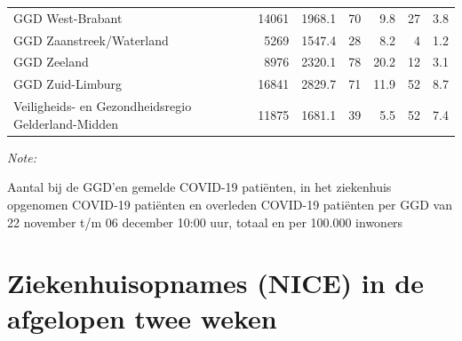 \documentclass[
  english,
  man,floatsintext]{apa6}
\begin{document}
\begin{table}
\begin{threeparttable}
\begin{tabular}{lrrrrrr}
GGD West-Brabant & 14061 & 1968.1 & 70 & 9.8 & 27 & 3.8\\
GGD Zaanstreek/Waterland & 5269 & 1547.4 & 28 & 8.2 & 4 & 1.2\\
GGD Zeeland & 8976 & 2320.1 & 78 & 20.2 & 12 & 3.1\\
GGD Zuid-Limburg & 16841 & 2829.7 & 71 & 11.9 & 52 & 8.7\\
Veiligheids- en Gezondheidsregio Gelderland-Midden & 11875 & 1681.1 & 39 & 5.5 & 52 & 7.4\\
\bottomrule
\end{tabular}
\begin{tablenotes}
\item \textit{Note: } 
\item Aantal bij de GGD’en gemelde COVID-19 patiënten, in het ziekenhuis opgenomen COVID-19 patiënten en overleden COVID-19 patiënten per GGD van 22 november t/m 06 december 10:00 uur, totaal en per 100.000 inwoners
\end{tablenotes}
\end{threeparttable}
\endgroup{}
\end{table}

\newpage

\hypertarget{ziekenhuisopnames-nice-in-de-afgelopen-twee-weken}{%
\section{Ziekenhuisopnames (NICE) in de afgelopen twee weken}\label{ziekenhuisopnames-nice-in-de-afgelopen-twee-weken}}
\end{document}
